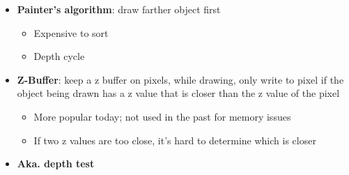   \begin{itemize}
    \item \textbf{Painter's algorithm}: draw farther object first
    \begin{itemize}
      \item Expensive to sort
      \item Depth cycle
    \end{itemize}

    \item \textbf{Z-Buffer}: keep a z buffer on pixels, while drawing,
    only write to pixel if the object being drawn has a z value that is
    closer than the z value of the pixel
    \begin{itemize}
      \item More popular today; not used in the past for memory issues
      \item If two z values are too close, it's hard to determine which is
      closer
    \end{itemize}

    \item \textbf{Aka. depth test}
  \end{itemize}
